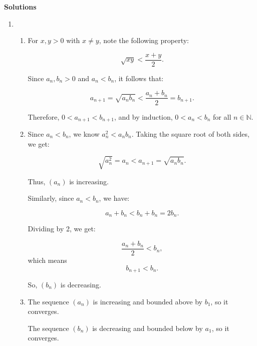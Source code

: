 \documentclass[12pt]{article}
\begin{document}
\newpage

\begin{center}
    \textbf{Solutions}
\end{center}
\begin{enumerate}
    \item
          \begin{enumerate}
              \item For \(x, y > 0\) with \(x \neq y\), note the following property:

                    \[
                        \sqrt{xy} < \frac{x + y}{2}.
                    \]

                    Since \(a_n, b_n > 0\) and \(a_n < b_n\), it follows that:

                    \[
                        a_{n+1} = \sqrt{a_n b_n} < \frac{a_n + b_n}{2} = b_{n+1}.
                    \]

                    Therefore, \(0 < a_{n+1} < b_{n+1}\), and by induction, \(0 < a_n < b_n\) for all \(n \in \mathbb{N}\).

              \item Since \(a_n < b_n\), we know \(a_{n}^{2} < a_{n}b_{n}\). Taking the square root of both sides, we get:

                    \[
                        \sqrt{a_{n}^{2}} = a_{n} < a_{n + 1} = \sqrt{a_{n}b_{n}}.
                    \]

                    Thus, \((a_n)\) is increasing.

                    Similarly, since \(a_n < b_n\), we have:

                    \[
                        a_{n} + b_{n} < b_{n} + b_{n} = 2b_{n}.
                    \]

                    Dividing by 2, we get:

                    \[
                        \frac{a_{n} + b_{n}}{2} < b_{n},
                    \]
                    which means
                    \[
                        b_{n + 1} < b_{n}.
                    \]

                    So, \((b_n)\) is decreasing.

              \item The sequence \((a_n)\) is increasing and bounded above by \(b_1\), so it converges.

                    The sequence \((b_n)\) is decreasing and bounded below by \(a_1\), so it converges.


\end{enumerate}
\end{enumerate}
\end{document}
